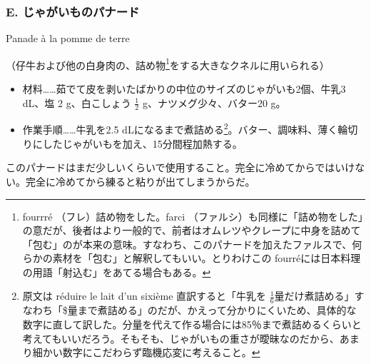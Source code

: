 \begin{recette}
\hypertarget{panade-e}{%
\subsubsection{E. じゃがいものパナード}\label{panade-e}}

\begin{frsubenv}

Panade à la pomme de terre

\end{frsubenv}


（仔牛および他の白身肉の、詰め物\footnote{fourrré
  （フレ）詰め物をした。farci
  （ファルシ）も同様に「詰め物をした」の意だが、後者はより一般的で、前者はオムレツやクレープに中身を詰めて「包む」のが本来の意味。すなわち、このパナードを加えたファルスで、何らかの素材を「包む」と解釈してもいい。とりわけこの
  fourréには日本料理の用語「射込む」をあてる場合もある。}をする大きなクネルに用いられる）

\begin{itemize}
\item
  材料\ldots{}\ldots{}茹でて皮を剥いたばかりの中位のサイズのじゃがいも2個、牛乳3
  dL、塩 2 g、白こしょう \(\frac{1}{2}\) g、ナツメグ少々、バター20 g。
\item
  作業手順\ldots{}\ldots{}牛乳を2.5 dLになるまで煮詰める\footnote{原文は
    réduire le lait d'un sixième 直訳すると「牛乳を
    \(\frac{1}{6}\)量だけ煮詰める」すなわち「\$量まで煮詰める」のだが、かえって分かりにくいため、具体的な数字に直して訳した。分量を代えて作る場合には85％まで煮詰めるくらいと考えてもいいだろう。そもそも、じゃがいもの重さが曖昧なのだから、あまり細かい数字にこだわらず臨機応変に考えること。}。バター、調味料、薄く輪切りにしたじゃがいもを加え、15分間程加熱する。
\end{itemize}

このパナードはまだ少しいくらいで使用すること。完全に冷めてからではいけない。完全に冷めてから練ると粘りが出てしまうからだ。

\end{recette}


